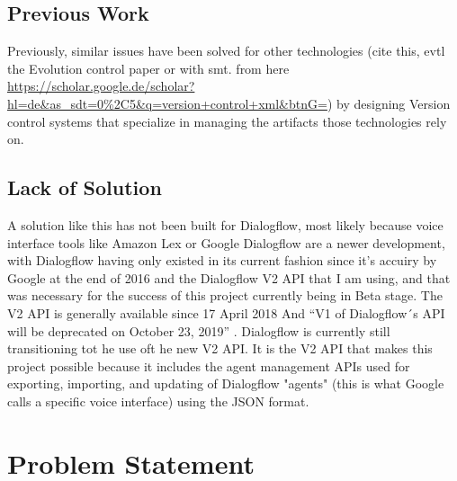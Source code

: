 \section{Previous Work}
Previously, similar issues have been solved for other technologies \citeNeeded (cite this, evtl the Evolution control paper or with smt. from here \url{https://scholar.google.de/scholar?hl=de&as_sdt=0%2C5&q=version+control+xml&btnG=})  by designing Version control systems that specialize in managing the artifacts those technologies rely on. 

\section{Lack of Solution}
A solution like this has not been built for Dialogflow, most likely because voice interface tools like Amazon Lex or Google Dialogflow are a newer development, with Dialogflow having only existed in its current fashion since it's accuiry by Google at the end of 2016 \cite{Huffman2016} and the Dialogflow V2 API that I am using, and that was necessary for the success of this project currently being in Beta stage. The V2 API is generally available since 17 April 2018 \cite{Imrie-Situnayake2018}
And “V1 of Dialogflow´s API will be deprecated on October 23, 2019” \cite{Dialogflow}.
Dialogflow is currently still transitioning tot he use oft he new V2 API.
It is the V2 API that makes this project possible because it includes the agent management APIs used for exporting, importing, and updating of Dialogflow "agents" (this is what Google calls a specific voice interface) using the JSON format.

\chapter{Problem Statement}

